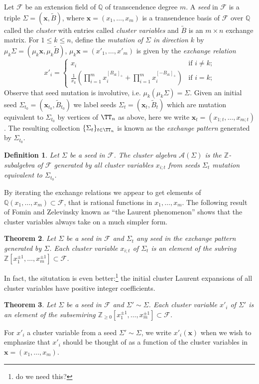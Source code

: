 \documentclass{amsart}
\newtheorem{theorem}{Theorem}[section]
\newtheorem{definition}[theorem]{Definition}
\newcommand{\bfx}{\mathbf{x}}
\newcommand{\cA}{\mathcal{A}}
\newcommand{\cF}{\mathcal{F}}
\newcommand{\QQ}{\mathbb{Q}}
\newcommand{\ZZ}{\mathbb{Z}}
\begin{document}
Let $\cF$ be an extension field of $\QQ$ of transcendence degree $m$.   
A \emph{seed} in $\cF$ is a triple $\Sigma=(\bfx,\tilde B)$, where $\bfx=(x_1,\ldots,x_m)$ is a transendence basis of $\cF$ over $\QQ$ called the \emph{cluster} with entries called \emph{cluster variables} and $\tilde B$ is an $m\times n$ exchange matrix.
For $1\le k\le n$, define the \emph{mutation of $\Sigma$ in direction $k$} by $\mu_k\Sigma=(\mu_k\bfx,\mu_k\tilde B)$, $\mu_k\bfx=(x'_1,\ldots,x'_m)$ is given by the \emph{exchange relation}
\begin{equation}
  \label{eq:exchange relations}
  x'_i=\begin{cases} x_i & \text{if $i\ne k$;}\\ \frac{1}{x_k}\left(\prod\limits_{i=1}^m x_i^{[B_{ik}]_+}+\prod\limits_{i=1}^m x_i^{[-B_{ik}]_+}\right) & \text{if $i=k$;}\end{cases}
\end{equation}
Observe that seed mutation is involutive, i.e. $\mu_k(\mu_k\Sigma)=\Sigma$.
Given an initial seed $\Sigma_{t_0}=(\bfx_{t_0},\tilde B_{t_0})$ we label seeds $\Sigma_t=(\bfx_t,\tilde B_t)$ which are mutation equivalent to $\Sigma_{t_0}$ by vertices of $\TT_n$ as above, here we write $\bfx_t=(x_{1;t},\ldots,x_{m;t})$.
The resulting collection $\{\Sigma_t\}_{t\in\TT_n}$ is known as the \emph{exchange pattern} generated by $\Sigma_{t_0}$.
\begin{definition}
  Let $\Sigma$ be a seed in $\cF$.  The \emph{cluster algebra} $\cA(\Sigma)$ is the $\ZZ$-subalgebra of $\cF$ generated by all cluster variables $x_{i;t}$ from seeds $\Sigma_t$ mutation equivalent to $\Sigma_{t_0}$.
\end{definition}
By iterating the exchange relations we appear to get elements of $\QQ(x_1,\ldots,x_m)\subset\cF$, that is rational functions in $x_1,\ldots,x_m$.  
The following result of Fomin and Zelevinsky known as ``the Laurent phenomenon'' shows that the cluster variables always take on a much simpler form.
\begin{theorem}
  \cite{fomin-zelevinsky1}
  Let $\Sigma$ be a seed in $\cF$ and $\Sigma_t$ any seed in the exchange pattern generated by $\Sigma$.
  Each cluster variable $x_{i;t}$ of $\Sigma_t$ is an element of the subring $\ZZ[x_1^{\pm1},\ldots,x_m^{\pm1}]\subset\cF$.
\end{theorem}

In fact, the situtation is even better:\footnote{do we need this?} the initial cluster Laurent expansions of all cluster variables have positive integer coefficients.
\begin{theorem}\cite{lee-schiffler, gross-hacking-keel-kontsevich}
  Let $\Sigma$ be a seed in $\cF$ and $\Sigma'\sim\Sigma$.  Each cluster variable $x'_i$ of $\Sigma'$ is an element of the subsemiring $\ZZ_{\ge0}[x_1^{\pm1},\ldots,x_m^{\pm1}]\subset\cF$. 
\end{theorem}
For $x'_i$ a cluster variable from a seed $\Sigma'\sim\Sigma$, we write $x'_i(\bfx)$ when we wish to emphasize that $x'_i$ should be thought of as a function of the cluster variables in $\bfx=(x_1,\ldots,x_m)$.
\end{document}

